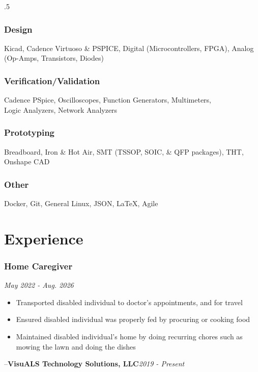\documentclass{article}
\newcommand{\companyHeader}[2]{--\large{\bfseries{#1}}\hfill \small{\textsl{#2}}}
\begin{document}
\begin{spacing}{.5}
		\subsubsection{Design} \large{\hspace*{2pt} Kicad}, \large{Cadence Virtuoso & PSPICE, Digital} \small{(Microcontrollers, FPGA), }\large{Analog} \small{(Op-Amps, Transistors, Diodes)}
		\subsubsection{Verification/Validation} \large{\hspace*{2pt} Cadence PSpice, Oscilloscopes, Function Generators, Multimeters,\\ \hspace*{.45cm} Logic Analyzers, Network Analyzers}
		\subsubsection{Prototyping} \large{\hspace*{2pt} Breadboard, Iron \& Hot Air, SMT} \small{(TSSOP, SOIC, \& QFP packages),} \large{ THT, Onshape CAD}

		\subsubsection{Other} \large{\hspace*{2pt} Docker, Git, General Linux, JSON, \LaTeX, Agile}

\section{Experience}
		\subsubsection{\large{Home Caregiver}} \hfill \small{\textsl{May 2022 - Aug. 2026}
			\begin{itemize}[label=--,itemsep=-.35ex]
				\item \large{Transported disabled individual to doctor's appointments, and for travel}
				\item \large{Ensured disabled individual was properly fed by procuring or cooking food}
				\item \large{Maintained disabled individual's home by doing recurring chores such as mowing the lawn and doing the dishes}
			\end{itemize}
	\companyHeader{VisuALS Technology Solutions, LLC}{2019 - Present}
}
\end{spacing}
\end{document}
